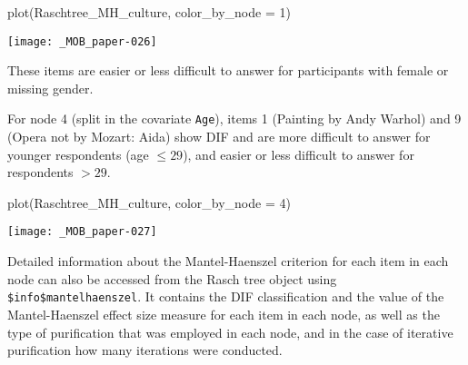 \documentclass[doc,floatsintext,natbib]{apa7}
\begin{document}
\begin{Schunk}
\begin{Sinput}
 plot(Raschtree_MH_culture, color_by_node = 1)
\end{Sinput}
\end{Schunk}
\texttt{[image: \_MOB\_paper-026]}

These items are %
easier or less difficult to answer for participants with female or missing gender.



For node 4 (split in the covariate \texttt{Age}), items 1 (Painting by Andy Warhol) and 9 (Opera not by Mozart: Aida) show DIF and are %
more difficult to answer for younger respondents (age $\leq 29$), and easier or less difficult to answer for respondents $>29$.

\begin{Schunk}
\begin{Sinput}
 plot(Raschtree_MH_culture, color_by_node = 4)
\end{Sinput}
\end{Schunk}
\texttt{[image: \_MOB\_paper-027]}

Detailed information about the Mantel-Haenszel criterion for each item in each node can also be accessed from the Rasch tree object using \texttt{\$info\$mantelhaenszel}. It contains the DIF classification and the value of the Mantel-Haenszel effect size measure for each item in each node, as well as the type of purification that was employed in each node, and in the case of iterative purification how many iterations were conducted.
\end{document}
